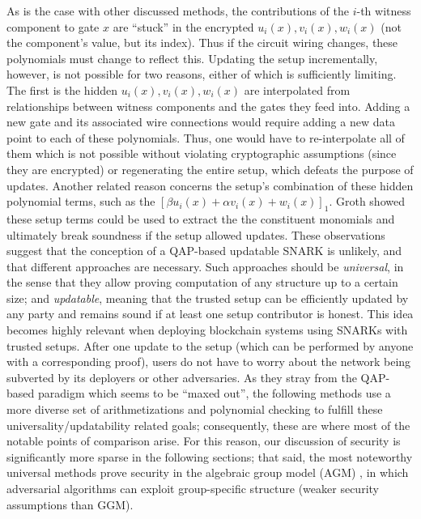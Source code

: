 \noindent As is the case with other discussed methods, the contributions of the $i$-th witness component to gate $x$ are ``stuck'' in the encrypted $u_i(x), v_i(x), w_i(x)$ (not the component's value, but its index). Thus if the circuit wiring changes, these polynomials must change to reflect this. Updating the setup incrementally, however, is not possible for two reasons, either of which is sufficiently limiting. The first is the hidden $u_i(x), v_i(x), w_i(x)$ are interpolated from relationships between witness components and the gates they feed into. Adding a new gate and its associated wire connections would require adding a new data point to each of these polynomials. Thus, one would have to re-interpolate all of them which is not possible without violating cryptographic assumptions (since they are encrypted) or regenerating the entire setup, which defeats the purpose of updates. Another related reason concerns the setup's combination of these hidden polynomial terms, such as the $[\beta u_i(x) + \alpha v_i(x) + w_i(x)]_1$. Groth \cite{grothupdatable} showed these setup terms could be used to extract the the constituent monomials and ultimately break soundness if the setup allowed updates. These observations suggest that the conception of a QAP-based updatable SNARK is unlikely, and that different approaches are necessary. Such approaches should be \textit{universal}, in the sense that they allow proving computation of any structure up to a certain size; and \textit{updatable}, meaning that the trusted setup can be efficiently updated by any party and remains sound if at least one setup contributor is honest. This idea becomes highly relevant when deploying blockchain systems using SNARKs with trusted setups. After one update to the setup (which can be performed by anyone with a corresponding proof), users do not have to worry about the network being subverted by its deployers or other adversaries. As they stray from the QAP-based paradigm which seems to be ``maxed out'', the following methods use a more diverse set of arithmetizations and polynomial checking to fulfill these universality/updatability related goals; consequently, these are where most of the notable points of comparison arise. For this reason, our discussion of security is significantly more sparse in the following sections; that said, the most noteworthy universal methods prove security in the algebraic group model (AGM) \cite{agm}, in which adversarial algorithms can exploit group-specific structure (weaker security assumptions than GGM). \\

